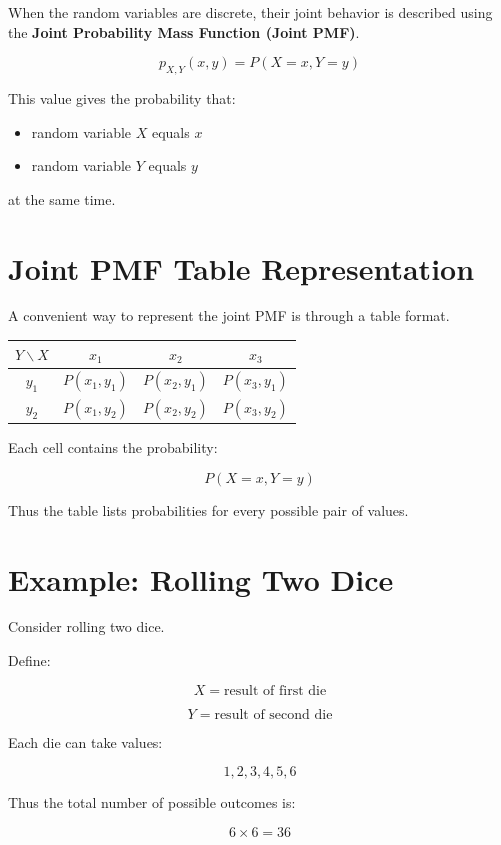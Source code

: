 \documentclass[12pt]{article}
\begin{document}
When the random variables are discrete, their joint behavior is described using the \textbf{Joint Probability Mass Function (Joint PMF)}.

\[
p_{X,Y}(x,y) = P(X = x, Y = y)
\]

This value gives the probability that:

\begin{itemize}
\item random variable $X$ equals $x$
\item random variable $Y$ equals $y$
\end{itemize}

at the same time.

\section{Joint PMF Table Representation}

A convenient way to represent the joint PMF is through a table format.

\begin{center}
\begin{tabular}{c|ccc}
\toprule
$Y \backslash X$ & $x_1$ & $x_2$ & $x_3$ \\
\midrule
$y_1$ & $P(x_1,y_1)$ & $P(x_2,y_1)$ & $P(x_3,y_1)$ \\
$y_2$ & $P(x_1,y_2)$ & $P(x_2,y_2)$ & $P(x_3,y_2)$ \\
\bottomrule
\end{tabular}
\end{center}

Each cell contains the probability:

\[
P(X=x, Y=y)
\]

Thus the table lists probabilities for every possible pair of values.

\section{Example: Rolling Two Dice}

Consider rolling two dice.

Define:

\[
X = \text{result of first die}
\]

\[
Y = \text{result of second die}
\]

Each die can take values:

\[
1,2,3,4,5,6
\]

Thus the total number of possible outcomes is:

\[
6 \times 6 = 36
\]
\end{document}
